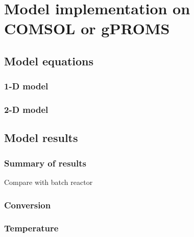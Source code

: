 \section{Model implementation on COMSOL or gPROMS}
\subsection{Model equations}
\subsubsection{1-D model}
\subsubsection{2-D model}
\subsection{Model results}
\subsubsection{Summary of results}
Compare with batch reactor
\subsubsection{Conversion}
\subsubsection{Temperature}